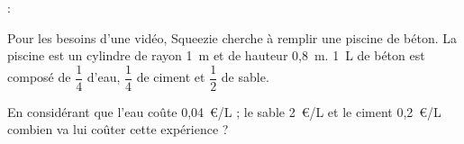  :

Pour les besoins d'une vidéo, Squeezie cherche à remplir une piscine de béton. 
La piscine est un cylindre de rayon 1~m et de hauteur 0,8~m. 
1~L de béton est composé de $\dfrac{1}{4}$ d'eau, $\dfrac{1}{4}$ de ciment et $\dfrac{1}{2}$ de sable.

En considérant que l'eau coûte 0,04~€/L ; le sable 2~€/L et le ciment 0,2~€/L combien va lui coûter cette expérience ?
